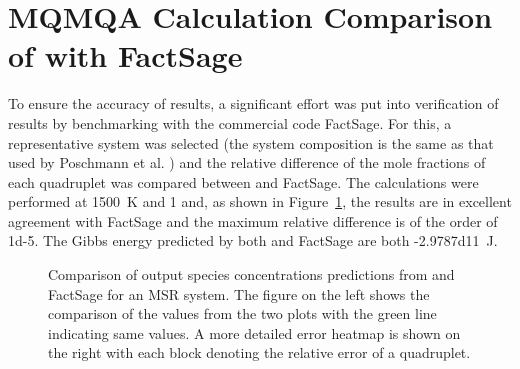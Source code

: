 \section{MQMQA Calculation Comparison of {\GEM} with FactSage}
To ensure the accuracy of results, a significant effort was put into verification of {\GEM} results by benchmarking with the commercial code FactSage. For this, a representative system was selected (the system composition is the same as that used by Poschmann et al. \cite{Poschmann:2021ab}) and the relative difference of the mole fractions of each quadruplet was compared between {\GEM} and FactSage. The calculations were performed at \SI{1500}{\kelvin} and \SI{1}{\atmosphere} and, as shown in Figure~\ref{fig:verif}, the results are in excellent agreement with FactSage and the maximum relative difference is of the order of \num{1d-5}. The Gibbs energy predicted by both {\GEM} and FactSage are both \SI{-2.9787d11}{\joule}. 
\begin{figure}[!ht]
    \hfill
    \caption[Comparison of output species concentrations predictions from {\GEM} and FactSage for an MSR system.]{Comparison of output species concentrations predictions from {\GEM} and FactSage for an MSR system. The figure on the left shows the comparison of the values from the two plots with the green line indicating same values. A more detailed error heatmap is shown on the right with each block denoting the relative error of a quadruplet.}
    \label{fig:verif}
\end{figure}


